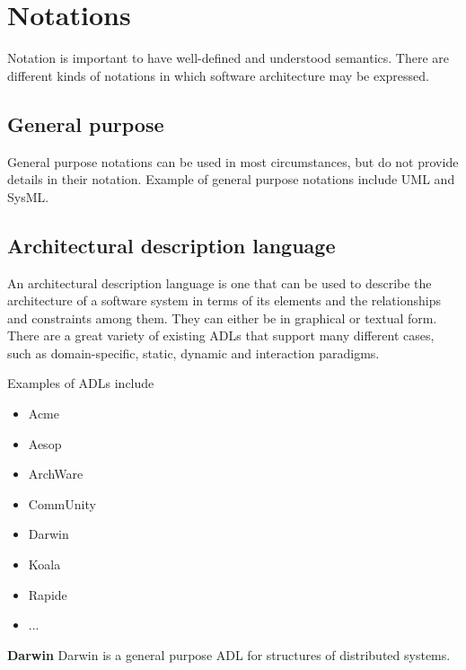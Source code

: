 \documentclass{sty/SizheArticle}
\begin{document}
\section{Notations}
Notation is important to have well-defined and understood semantics.
There are different kinds of notations in which software
architecture may be expressed. 
\subsection{General purpose}
General purpose notations can be used in most circumstances, but do not
provide details in their notation. Example of general purpose notations
include UML and SysML.

\subsection{Architectural description language}
An architectural description language is one that can be used to describe
the architecture of a software system in terms of its elements and the
relationships and constraints among them. They can either be in graphical
or textual form. There are a great variety of existing ADLs that
support many different cases, such as domain-specific, static, dynamic
and interaction paradigms.

Examples of ADLs include
\begin{itemize}
\item Acme
\item Aesop
\item ArchWare
\item CommUnity
\item Darwin
\item Koala
\item Rapide
\item ...
\end{itemize}

\textbf{Darwin}
Darwin is a general purpose ADL for structures of distributed systems.
\end{document}
